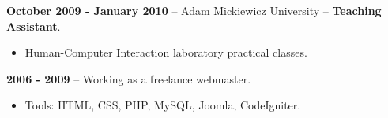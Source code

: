 \documentclass[10pt]{article}
\renewcommand{\section}[2]%
        {\pagebreak[2]\vspace{1.3\baselineskip}%
         \phantomsection\addcontentsline{toc}{section}{#1}%
         \hspace{0in}%
         \marginpar{
         \raggedright \scshape #1}#2}
\begin{document}
\textbf{October 2009 - January 2010} -- Adam Mickiewicz University -- \textbf{Teaching Assistant}.
\begin{itemize}
 \item Human-Computer Interaction laboratory practical classes.
\end{itemize}


\textbf{2006 - 2009} -- Working as a freelance webmaster.
\begin{itemize}
  \item Tools: HTML, CSS, PHP, MySQL, Joomla, CodeIgniter.%
\end{itemize}










\end{document}
